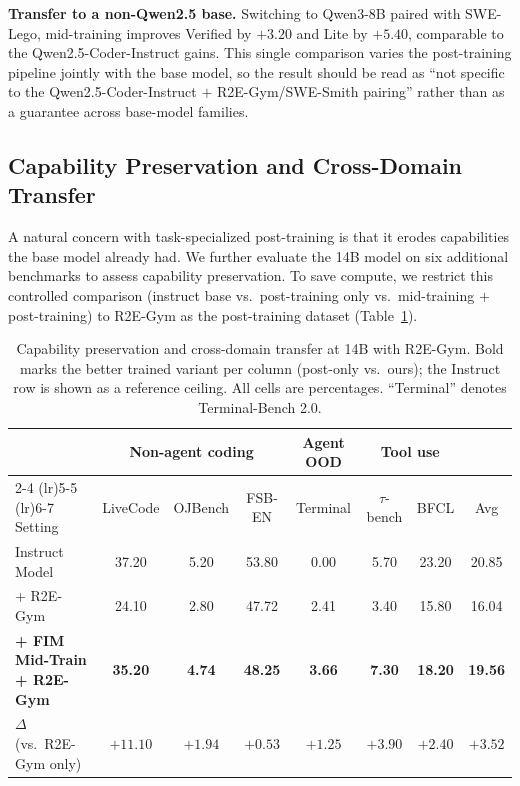 \textbf{Transfer to a non-Qwen2.5 base.}
Switching to Qwen3-8B paired with SWE-Lego, mid-training improves
Verified by $+3.20$ and Lite by $+5.40$, comparable to the Qwen2.5-Coder-Instruct
gains. This single comparison varies the post-training pipeline jointly
with the base model, so the
result should be read as ``not specific to the Qwen2.5-Coder-Instruct $+$
R2E-Gym/SWE-Smith pairing'' rather than as a guarantee across
base-model families.

\vspace{-0.5ex}
\subsection{Capability Preservation and Cross-Domain Transfer}
\label{sec:exp:gen}

A natural concern with task-specialized post-training is that it erodes
capabilities the base model already had. We further evaluate the 14B model on six additional benchmarks to assess
capability preservation. To save compute, we restrict this controlled
comparison (instruct base vs.\ post-training only vs.\ mid-training $+$
post-training) to R2E-Gym as the post-training dataset (Table~\ref{tab:cap}).

\begin{table}[t]
\centering
\caption{Capability preservation and cross-domain transfer at 14B with
R2E-Gym. Bold marks the better trained variant per column (post-only
vs.\ ours); the Instruct row is shown as a reference ceiling. All cells
are percentages. ``Terminal'' denotes Terminal-Bench 2.0.}
\label{tab:cap}
\small
\setlength{\tabcolsep}{4pt}
\begin{tabular}{lcccccc|c}
\toprule
& \multicolumn{3}{c}{Non-agent coding}
& \multicolumn{1}{c}{Agent OOD}
& \multicolumn{2}{c}{Tool use}
& \\
\cmidrule(lr){2-4} \cmidrule(lr){5-5} \cmidrule(lr){6-7}
Setting
& LiveCode & OJBench & FSB-EN
& Terminal
& $\tau$-bench & BFCL
& Avg \\
\midrule
Instruct Model
  & 37.20 & 5.20 & 53.80
  & 0.00
  & 5.70 & 23.20
  & 20.85 \\
+ R2E-Gym
  & 24.10 & 2.80 & 47.72
  & 2.41
  & 3.40 & 15.80
  & 16.04 \\
\textbf{+ FIM Mid-Train + R2E-Gym}
  & \textbf{35.20} & \textbf{4.74} & \textbf{48.25}
  & \textbf{3.66}
  & \textbf{7.30} & \textbf{18.20}
  & \textbf{19.56} \\
\rowcolor{blue!8}
$\Delta$ (vs.\ R2E-Gym only)
  & $+11.10$ & $+1.94$ & $+0.53$
  & $+1.25$
  & $+3.90$ & $+2.40$
  & $+3.52$ \\
\bottomrule
\end{tabular}
\end{table}

